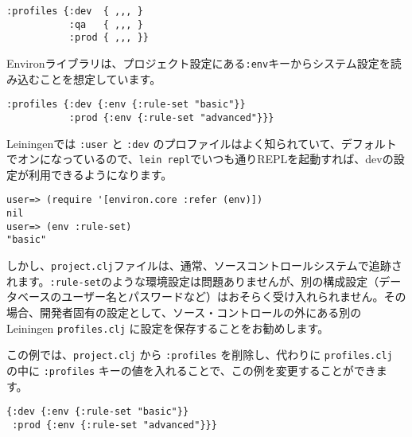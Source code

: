 \begin{lstlisting}[numbers=none]
:profiles {:dev  { ,,, }
           :qa   { ,,, }
           :prod { ,,, }}
\end{lstlisting}

Environライブラリは、プロジェクト設定にある\texttt{:env}キーからシステム設定を読み込むことを想定しています。

\begin{lstlisting}[numbers=none]
:profiles {:dev {:env {:rule-set "basic"}}
           :prod {:env {:rule-set "advanced"}}}
\end{lstlisting}

Leiningenでは \texttt{:user} と \texttt{:dev} のプロファイルはよく知られていて、デフォルトでオンになっているので、\texttt{lein repl}でいつも通りREPLを起動すれば、devの設定が利用できるようになります。

\begin{lstlisting}[numbers=none]
user=> (require '[environ.core :refer (env)])
nil
user=> (env :rule-set)
"basic"
\end{lstlisting}

しかし、\texttt{project.clj}ファイルは、通常、ソースコントロールシステムで追跡されます。\texttt{:rule-set}のような環境設定は問題ありませんが、別の構成設定（データベースのユーザー名とパスワードなど）はおそらく受け入れられません。その場合、開発者固有の設定として、ソース・コントロールの外にある別の Leiningen \texttt{profiles.clj} に設定を保存することをお勧めします。

この例では、\texttt{project.clj} から \texttt{:profiles} を削除し、代わりに \texttt{profiles.clj} の中に \texttt{:profiles} キーの値を入れることで、この例を変更することができます。


\begin{lstlisting}[numbers=none]
{:dev {:env {:rule-set "basic"}}
 :prod {:env {:rule-set "advanced"}}}
\end{lstlisting}


